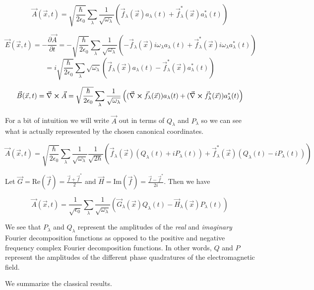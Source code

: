 \documentclass[12pt]{article}
\newcommand{\pardiv}[2][]{\frac{\partial #1}{\partial #2}}
\newcommand{\vecnab}{\vec{\nabla}}
\begin{document}
\[ \vec{A}(\vec{x},t) = \sqrt{\frac{\hbar}{2\epsilon_0}}\sum_{\lambda}\frac{1}{\sqrt{\omega_{\lambda}}}\left(\vec{f}_{\lambda}(\vec{x}) a_{\lambda}(t) + \vec{f}_{\lambda}^*(\vec{x})a_{\lambda}^*(t)\right) \]

\[ \vec{E}(\vec{x},t) = -\pardiv[\vec{A}]{t} = -\sqrt{\frac{\hbar}{2\epsilon_0}}\sum_{\lambda} \frac{1}{\sqrt{\omega_{\lambda}}}\left(-\vec{f}_{\lambda}(\vec{x}) i\omega_{\lambda}a_{\lambda}(t) + \vec{f}_{\lambda}^*(\vec{x})i\omega_{\lambda}a_{\lambda}^*(t)\right)\]
\[ = i\sqrt{\frac{\hbar}{2\epsilon_0}}\sum_{\lambda} \sqrt{\omega_{\lambda}}\left(\vec{f}_{\lambda}(\vec{x}) a_{\lambda}(t) - \vec{f}_{\lambda}^*(\vec{x})a_{\lambda}^*(t)\right)\]

\[ \vec{B}(\vec{x},t) = \vecnab \cross \vec{A} = \sqrt{\frac{\hbar}{2\epsilon_0}}\sum_{\lambda}\frac{1}{\sqrt{\omega_{\lambda}}}\left((\vecnab \cross \vec{f}_{\lambda}(\vec{x})) a_{\lambda}(t) + (\vecnab \cross \vec{f}_{\lambda}^*(\vec{x}))a_{\lambda}^*(t)\right) \]

For a bit of intuition we will write $\vec{A}$ out in terms of $Q_{\lambda}$ and $P_{\lambda}$ so we can see what is actually represented by the chosen canonical coordinates.

\[ \vec{A}(\vec{x},t) = \sqrt{\frac{\hbar}{2\epsilon_0}} \sum_{\lambda} \frac{1}{\sqrt{\omega_{\lambda}}} \frac{1}{\sqrt{2\hbar}} \left( \vec{f}_{\lambda}(\vec{x})(Q_{\lambda}(t)+iP_{\lambda}(t)) + \vec{f}_{\lambda}^*(\vec{x})(Q_{\lambda}(t)-iP_{\lambda}(t)) \right)\]

Let $\vec{G} = \text{Re}(\vec{f}) = \frac{\vec{f}+\vec{f}^*}{2}$ and $\vec{H} = \text{Im}(\vec{f}) = \frac{\vec{f}-\vec{f}^*}{2i}$. Then we have

\[\vec{A}(\vec{x},t) = \frac{1}{\sqrt{\epsilon_0}} \sum_{\lambda} \frac{1}{\sqrt{\omega_{\lambda}}} \left(\vec{G}_{\lambda}(\vec{x}) Q_{\lambda}(t) - \vec{H}_{\lambda}(\vec{x}) P_{\lambda}(t)\right) \]

We see that $P_{\lambda}$ and $Q_{\lambda}$ represent the amplitudes of the \textit{real} and \textit{imaginary} Fourier decomposition functions as opposed to the positive and negative frequency complex Fourier decomposition functions. In other words, $Q$ and $P$ represent the amplitudes of the different phase quadratures of the electromagnetic field.

We summarize the classical results.
\end{document}
